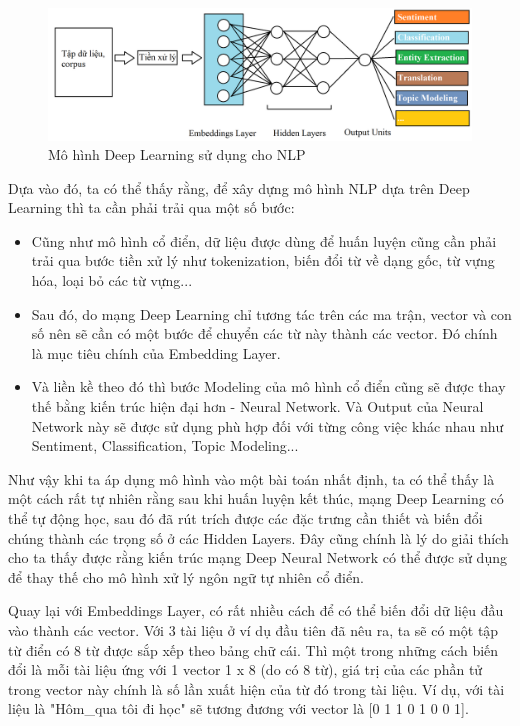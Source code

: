 \begin{figure}[h!]
\begin{center}
	\includegraphics[width=1.0\textwidth]{chapter04/figure/nlp-deep-model.png}
	\caption{Mô hình Deep Learning sử dụng cho NLP}
	\label{fig:deep-learning-based-nlp}
\end{center}
\end{figure}

Dựa vào đó, ta có thể thấy rằng, để xây dựng mô hình NLP dựa trên Deep Learning thì ta cần phải trải qua một số bước:
\begin{itemize}
    \item Cũng như mô hình cổ điển, dữ liệu được dùng để huấn luyện cũng cần phải trải qua bước tiền xử lý như tokenization, biến đổi từ về dạng gốc, từ vựng hóa, loại bỏ các từ vựng...
    \item Sau đó, do mạng Deep Learning chỉ tương tác trên các ma trận, vector và con số nên sẽ cần có một bước để chuyển các từ này thành các vector. Đó chính là mục tiêu chính của Embedding Layer.
    \item Và liền kề theo đó thì bước Modeling của mô hình cổ điển cũng sẽ được thay thế bằng kiến trúc hiện đại hơn - Neural Network. Và Output của Neural Network này sẽ được sử dụng phù hợp đối với từng công việc khác nhau như Sentiment, Classification, Topic Modeling...
\end{itemize}

Như vậy khi ta áp dụng mô hình vào một bài toán nhất định, ta có thể thấy là một cách rất tự nhiên rằng sau khi huấn luyện kết thúc, mạng Deep Learning có thể tự động học, sau đó đã rút trích được các đặc trưng cần thiết và biến đổi chúng thành các trọng số  ở các Hidden Layers. Đây cũng chính là lý do giải thích cho ta thấy được rằng kiến trúc mạng Deep Neural Network có thể được sử dụng để thay thế cho mô hình xử lý ngôn ngữ tự nhiên cổ điển.

Quay lại với Embeddings Layer, có rất nhiều cách để có thể biến đổi dữ liệu đầu vào thành các vector. Với 3 tài liệu ở ví dụ đầu tiên đã nêu ra, ta sẽ có một tập từ điển có 8 từ được sắp xếp theo bảng chữ cái. Thì một trong những cách biến đổi là mỗi tài liệu ứng với 1 vector 1 x 8 (do có 8 từ), giá trị của các phần tử trong vector này chính là số lần xuất hiện của từ đó trong tài liệu. Ví dụ, với tài liệu là "Hôm\_qua tôi đi học" sẽ tương đương với vector là [0 1 1 0 1 0 0 1].

